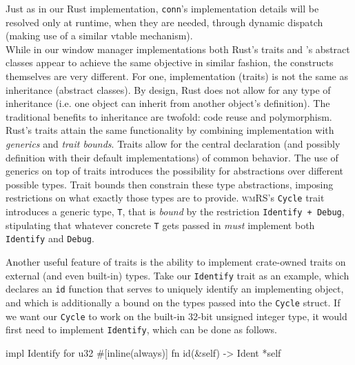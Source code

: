 Just  as in  our  Rust  implementation, \texttt{conn}'s  implementation
details will be resolved only at  runtime, when they are needed, through dynamic
dispatch (making use of a similar vtable mechanism).\\


While  in our  window  manager  implementations both  Rust's  traits and  \cpp's
abstract classes  appear to achieve the  same objective in similar  fashion, the
constructs themselves  are very different.  For one, implementation  (traits) is
not the same  as inheritance (abstract classes). By design,  Rust does not allow
for any type  of inheritance (i.e. one object can  inherit from another object's
definition). The  traditional benefits  to inheritance  are twofold:  code reuse
and  polymorphism. Rust's  traits  attain the  same  functionality by  combining
implementation with  \textit{generics} and  \textit{trait bounds}.  Traits allow
for  the  central  declaration  (and  possibly  definition  with  their  default
implementations)  of common  behavior.  The use  of generics  on  top of  traits
introduces the possibility for abstractions over different possible types. Trait
bounds then  constrain these  type abstractions,  imposing restrictions  on what
exactly  those types  are to  provide. \textsc{wmRS}'s  \texttt{Cycle}
trait introduces a generic type, \texttt{T}, that is \textit{bound} by
the restriction  \texttt{Identify + Debug}, stipulating  that whatever
concrete  \texttt{T}  gets  passed  in  \textit{must}  implement  both
\texttt{Identify} and \texttt{Debug}.

Another useful feature of traits is  the ability to implement crate-owned traits
on  external (and  even  built-in) types.  Take our  \texttt{Identify}
trait  as an  example,  which declares  an  \texttt{id} function  that
serves to uniquely identify an implementing  object, and which is additionally a
bound on the  types passed into the \texttt{Cycle} struct.  If we want
our \texttt{Cycle}  to work  on the  built-in 32-bit  unsigned integer
type, it would first need to implement \texttt{Identify}, which can be
done as follows.

\begin{rustblock}
  impl Identify for u32 {
    #[inline(always)]
    fn id(&self) -> Ident {
      *self
    }
  }
\end{rustblock}

